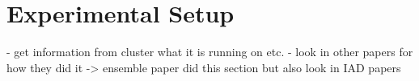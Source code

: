 \chapter{Experimental Setup}
\label{chap:experimentsetup}


- get information from cluster what it is running on etc.
- look in other papers for how they did it
-> ensemble paper did this section but also look in IAD papers





